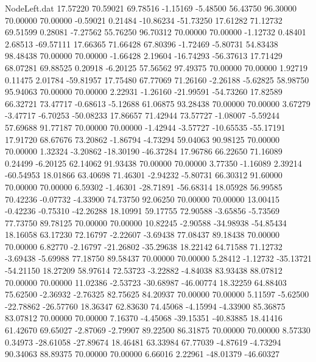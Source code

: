 \begin{filecontents}{NodeLeft.dat}
  17.57220   70.59021   69.78516    -1.15169   -5.48500   56.43750   96.30000   70.00000   70.00000   -0.59021    0.21484  -10.86234  -51.73250
  17.61282   71.12732   69.51599     0.28081   -7.27562   55.76250   96.70312   70.00000   70.00000   -1.12732    0.48401    2.68513  -69.57111
  17.66365   71.66428   67.80396    -1.72469   -5.80731   54.83438   98.48438   70.00000   70.00000   -1.66428    2.19604  -16.74293  -56.37613
  17.71429   68.07281   69.88525     0.20918   -6.20125   57.56562   97.49375   70.00000   70.00000    1.92719    0.11475    2.01784  -59.81957
  17.75480   67.77069   71.26160    -2.26188   -5.62825   58.98750   95.94063   70.00000   70.00000    2.22931   -1.26160  -21.99591  -54.73260
  17.82589   66.32721   73.47717    -0.68613   -5.12688   61.06875   93.28438   70.00000   70.00000    3.67279   -3.47717   -6.70253  -50.08233
  17.86657   71.42944   73.57727    -1.08007   -5.59244   57.69688   91.77187   70.00000   70.00000   -1.42944   -3.57727  -10.65535  -55.17191
  17.91720   68.67676   73.20862    -1.86794   -4.73294   59.04063   90.98125   70.00000   70.00000    1.32324   -3.20862  -18.30190  -46.37284
  17.96786   66.22650   71.16089     0.24499   -6.20125   62.14062   91.93438   70.00000   70.00000    3.77350   -1.16089    2.39214  -60.54953
  18.01866   63.40698   71.46301    -2.94232   -5.80731   66.30312   91.60000   70.00000   70.00000    6.59302   -1.46301  -28.71891  -56.68314
  18.05928   56.99585   70.42236    -0.07732   -4.33900   74.73750   92.06250   70.00000   70.00000   13.00415   -0.42236   -0.75310  -42.26288
  18.10991   59.17755   72.90588    -3.65856   -5.73569   77.73750   89.78125   70.00000   70.00000   10.82245   -2.90588  -34.98938  -54.85434
  18.16058   63.17230   72.16797    -2.22607   -3.69438   77.08437   89.18438   70.00000   70.00000    6.82770   -2.16797  -21.26802  -35.29638
  18.22142   64.71588   71.12732    -3.69438   -5.69988   77.18750   89.58437   70.00000   70.00000    5.28412   -1.12732  -35.13721  -54.21150
  18.27209   58.97614   72.53723    -3.22882   -4.84038   83.93438   88.07812   70.00000   70.00000   11.02386   -2.53723  -30.68987  -46.00774
  18.32259   64.88403   75.62500    -2.36932   -2.76325   82.75625   84.20937   70.00000   70.00000    5.11597   -5.62500  -22.78862  -26.57760
  18.36347   62.83630   74.45068    -4.15994   -4.33900   85.36875   83.07812   70.00000   70.00000    7.16370   -4.45068  -39.15351  -40.83885
  18.41416   61.42670   69.65027    -2.87069   -2.79907   89.22500   86.31875   70.00000   70.00000    8.57330    0.34973  -28.61058  -27.89674
  18.46481   63.33984   67.77039    -4.87619   -4.73294   90.34063   88.89375   70.00000   70.00000    6.66016    2.22961  -48.01379  -46.60327

\end{filecontents}
